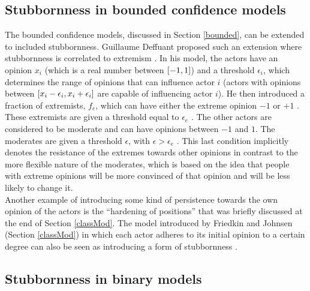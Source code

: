 \documentclass[11 pt , letterpaper , twoside , openright]{book}
\begin{document}
\subsection{Stubbornness in bounded confidence models}

The bounded confidence models, discussed in Section \ref{bounded}, can be extended to included stubbornness. Guillaume Deffuant proposed such an extension where stubbornness is correlated to extremism \cite{Deffuant2006}. In his model, the actors have an opinion $x_i$ (which is a real number between $\interval{-1}{1}$) and a threshold $\epsilon_i$, which determines the range of opinions that can influence actor $i$ (actors with opinions between $\interval{x_i - \epsilon_i}{x_i + \epsilon_i}$ are capable of influencing actor $i$). He then introduced a fraction of extremists, $f_e$, which can have either the extreme opinion $-1$ or $+1$ \cite{Deffuant2006}. These extremists are given a threshold equal to $\epsilon_e$ \cite{Deffuant2006}. The other actors are considered to be moderate and can have opinions between $-1$ and $1$. The moderates are given a threshold $\epsilon$, with $\epsilon > \epsilon_e$ \cite{Deffuant2006}. This last condition implicitly denotes the resistance of the extremes towards other opinions in contrast to the more flexible nature of the moderates, which is based on the idea that people with extreme opinions will be more convinced of that opinion and will be less likely to change it.\\
\newline
Another example of introducing some kind of persistence towards the own opinion of the actors is the ``hardening of positions'' that was briefly discussed at the end of Section \ref{classMod}. The model introduced by Friedkin and Johnsen (Section \ref{classMod}) in which each actor adheres to its initial opinion to a certain degree can also be seen as introducing a form of stubbornness \cite{Noorazar2020}.

\subsection{Stubbornness in binary models}
\label{stubbBin}
\end{document}

